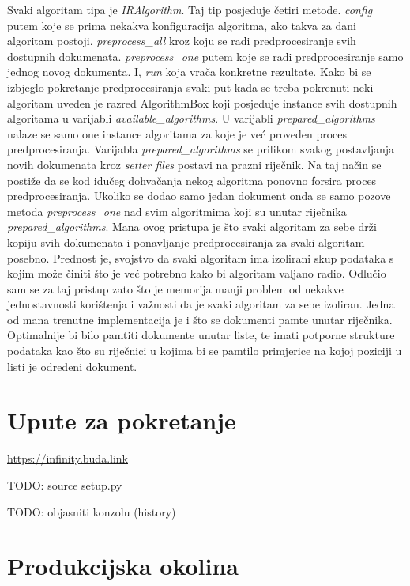 \documentclass[a4paper,12pt]{article}
\begin{document}
Svaki algoritam tipa je \textit{IRAlgorithm}. Taj tip posjeduje četiri metode. \textit{config} putem koje se prima nekakva konfiguracija algoritma, ako takva za dani algoritam postoji. \textit{preprocess\_all} kroz koju se radi predprocesiranje svih dostupnih dokumenata. \textit{preprocess\_one} putem koje se radi predprocesiranje samo jednog novog dokumenta. I, \textit{run} koja vrača konkretne rezultate. Kako bi se izbjeglo pokretanje predprocesiranja svaki put kada se treba pokrenuti neki algoritam uveden je razred AlgorithmBox koji posjeduje instance svih dostupnih algoritama u varijabli \textit{available\_algorithms}. U varijabli \textit{prepared\_algorithms} nalaze se samo one instance algoritama za koje je već proveden proces predprocesiranja. Varijabla \textit{prepared\_algorithms} se prilikom svakog postavljanja novih dokumenata kroz \textit{setter files} postavi na prazni riječnik. Na taj način se postiže da se kod idučeg dohvačanja nekog algoritma ponovno forsira proces predprocesiranja. Ukoliko se dodao samo jedan dokument onda se samo pozove metoda \textit{preprocess\_one} nad svim algoritmima koji su unutar riječnika \textit{prepared\_algorithms}. Mana ovog pristupa je što svaki algoritam za sebe drži kopiju svih dokumenata i ponavljanje predprocesiranja za svaki algoritam posebno. Prednost je, svojstvo da svaki algoritam ima izolirani skup podataka s kojim može činiti što je već potrebno kako bi algoritam valjano radio. Odlučio sam se za taj pristup zato što je memorija manji problem od nekakve jednostavnosti korištenja i važnosti da je svaki algoritam za sebe izoliran. Jedna od mana trenutne implementacija je i što se dokumenti pamte unutar riječnika. Optimalnije bi bilo pamtiti dokumente unutar liste, te imati potporne strukture podataka kao što su riječnici u kojima bi se pamtilo primjerice na kojoj poziciji u listi je određeni dokument.

\section{Upute za pokretanje}

\url{https://infinity.buda.link}

TODO: source setup.py

TODO: objasniti konzolu (history)

\section{Produkcijska okolina}
\end{document}
